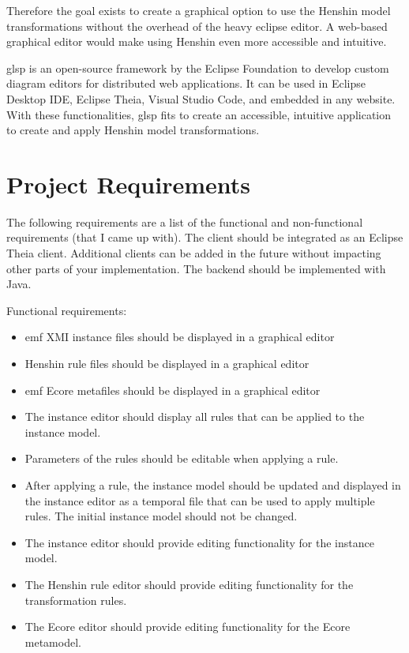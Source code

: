 \documentclass[conference,onecolumn]{IEEEtran}
\begin{document}
  Therefore the goal exists to create a graphical option to use the Henshin model transformations without the overhead of the heavy eclipse editor. A web-based graphical editor would make using Henshin even more accessible and intuitive.

  \ac{glsp} is an open-source framework by the Eclipse Foundation to develop custom diagram editors for distributed web applications. \cite{glsp-repo} It can be used in Eclipse Desktop IDE, Eclipse Theia, Visual Studio Code, and embedded in any website. With these functionalities, \ac{glsp} fits to create an accessible, intuitive application to create and apply Henshin model transformations.

  \section{Project Requirements}
  \label{subsec:requirements}

  The following requirements are a list of the functional and non-functional requirements (that I came up with). The client should be integrated as an Eclipse Theia client. Additional clients can be added in the future without impacting other parts of your implementation. \cite{eclipseGLSP} The backend should be implemented with Java.

  Functional requirements:

  \begin{itemize}
  
    \item \ac{emf} XMI instance files should be displayed in a graphical editor
    \item Henshin rule files should be displayed in a graphical editor
    \item \ac{emf} Ecore metafiles should be displayed in a graphical editor
    \item The instance editor should display all rules that can be applied to the instance model.
    \item Parameters of the rules should be editable when applying a rule.
    \item After applying a rule, the instance model should be updated and displayed in the instance editor as a temporal file that can be used to apply multiple rules. The initial instance model should not be changed.
    \item The instance editor should provide editing functionality for the instance model.
    \item The Henshin rule editor should provide editing functionality for the transformation rules.
    \item The Ecore editor should provide editing functionality for the Ecore metamodel.

  \end{itemize}
\end{document}
